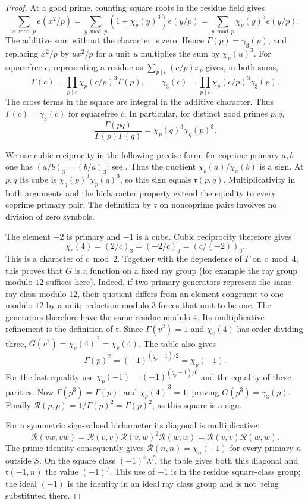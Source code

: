 \documentclass[11pt,a4paper]{article}
\numberwithin{equation}{section}
\numberwithin{figure}{section}
\theoremstyle{definition}
\theoremstyle{remark}
\begin{document}
\begin{proof}
At a good prime, counting square roots in the residue field gives
\[
 \sum_{x\bmod p}e(x^2/p)
 =\sum_{y\bmod p}(1+\chi_p(y)^3)e(y/p)
 =\sum_{y\bmod p}\chi_p(y)^3e(y/p).
\]
The additive sum without the character is zero.  Hence
$\Gamma(p)=\gamma_3(p)$, and replacing $x^2/p$ by $ux^2/p$ for a unit $u$
multiplies the sum by $\chi_p(u)^3$.  For squarefree $c$, representing a
residue as $\sum_{p\mid c}(c/p)x_p$ gives, in both sums,
\[
 \Gamma(c)=\prod_{p\mid c}\chi_p(c/p)^3\Gamma(p),\qquad
 \gamma_3(c)=\prod_{p\mid c}\chi_p(c/p)^3\gamma_3(p).
\]
The cross terms in the square are integral in the additive character.
Thus $\Gamma(c)=\gamma_3(c)$ for squarefree $c$.  In particular, for distinct
good primes $p,q$,
\[
 \frac{\Gamma(pq)}{\Gamma(p)\Gamma(q)}
 =\chi_p(q)^3\chi_q(p)^3.
\]

We use cubic reciprocity in the following precise form: for coprime primary
$a,b$ one has $(a/b)_3=(b/a)_3$; see \cite[Equation (1.4)]{DR}.  Thus the
quotient $\chi_b(a)/\chi_a(b)$ is a sign.  At $p,q$ its cube is
$\chi_q(p)^3\chi_p(q)^3$, so this sign equals $\mathfrak r(p,q)$.
Multiplicativity in both arguments and the bicharacter property extend the
equality to every coprime primary pair.  The definition by $\mathfrak r$ on
noncoprime pairs involves no division of zero symbols.

The element $-2$ is primary and $-1$ is a cube.  Cubic reciprocity therefore
gives
\[
 \chi_c(4)=(2/c)_3=(-2/c)_3=(c/(-2))_3.
\]
This is a character of $c\bmod2$.  Together with the dependence of $\Gamma$
on $c\bmod4$, this proves that $G$ is a function on a fixed ray group (for
example the ray group modulo $12$ suffices here).  Indeed, if two primary
generators represent the same ray class modulo $12$, their quotient differs
from an element congruent to one modulo $12$ by a unit; reduction modulo $3$
forces that unit to be one.  The generators therefore have the same residue
modulo $4$.  Its multiplicative
refinement is the definition of $\mathfrak r$.  Since
$\Gamma(v^2)=1$ and $\chi_v(4)$ has order dividing three,
$G(v^2)=\overline{\chi_v(4)}^{\,2}=\chi_v(4)$.  The table also gives
\[
 \Gamma(p)^2=(-1)^{(q_p-1)/2}=\chi_p(-1).
\]
For the last equality use
$\chi_p(-1)=(-1)^{(q_p-1)/6}$ and the equality of these parities.
Now $\Gamma(p^3)=\Gamma(p)$, and
$\overline{\chi_p(4)}^{\,3}=1$, proving $G(p^3)=\gamma_3(p)$.  Finally
$\mathcal R(p,p)=1/\Gamma(p)^2=\Gamma(p)^2$, as this square is a sign.

For a symmetric sign-valued bicharacter its diagonal is multiplicative:
\[
 \mathcal R(vw,vw)
 =\mathcal R(v,v)\mathcal R(v,w)^2\mathcal R(w,w)
 =\mathcal R(v,v)\mathcal R(w,w).
\]
The prime identity consequently gives $\mathcal R(n,n)=\chi_n(-1)$ for
every primary $n$ outside $S$.  On the square class $(-1)^e\lambda^f$, the
table gives both this diagonal and $\mathfrak r(-1,n)$ the value $(-1)^f$.
This use of $-1$ is in the residue square-class group; the ideal $(-1)$ is
the identity in an ideal ray class group and is not being substituted there.


\end{proof}
\end{document}

